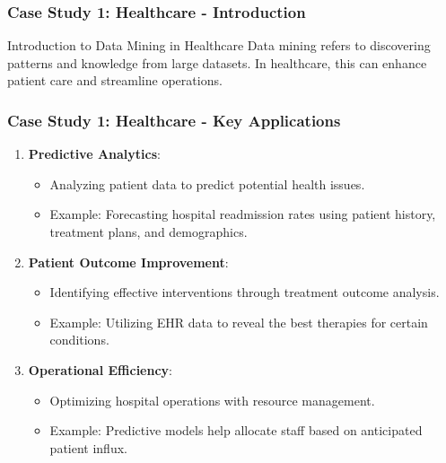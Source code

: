 \documentclass[aspectratio=169]{beamer}
\begin{document}
\begin{frame}[fragile]
    \frametitle{Case Study 1: Healthcare - Introduction}
    \begin{block}{Introduction to Data Mining in Healthcare}
        Data mining refers to discovering patterns and knowledge from large datasets. 
        In healthcare, this can enhance patient care and streamline operations.
    \end{block}
\end{frame}

\begin{frame}[fragile]
    \frametitle{Case Study 1: Healthcare - Key Applications}
    \begin{enumerate}
        \item \textbf{Predictive Analytics}:
            \begin{itemize}
                \item Analyzing patient data to predict potential health issues.
                \item Example: Forecasting hospital readmission rates using patient history, treatment plans, and demographics.
            \end{itemize}
        
        \item \textbf{Patient Outcome Improvement}:
            \begin{itemize}
                \item Identifying effective interventions through treatment outcome analysis.
                \item Example: Utilizing EHR data to reveal the best therapies for certain conditions.
            \end{itemize}
        
        \item \textbf{Operational Efficiency}:
            \begin{itemize}
                \item Optimizing hospital operations with resource management.
                \item Example: Predictive models help allocate staff based on anticipated patient influx.
            \end{itemize}
    \end{enumerate}
\end{frame}
\end{document}
